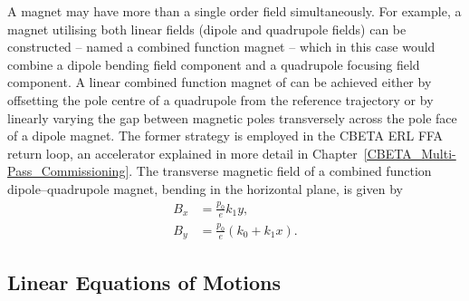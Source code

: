 \documentclass[../main.tex]{subfiles}
\begin{document}
A magnet may have more than a single order field simultaneously. For example, a magnet utilising both linear fields (dipole and quadrupole fields) can be constructed -- named a combined function magnet -- which in this case would combine a dipole bending field component and a quadrupole focusing field component. A linear combined function magnet of can be achieved either by offsetting the pole centre of a quadrupole from the reference trajectory or by linearly varying the gap between magnetic poles transversely across the pole face of a dipole magnet. The former strategy is employed in the CBETA ERL FFA return loop, an accelerator explained in more detail in Chapter~\ref{CBETA_Multi-Pass_Commissioning}. The transverse magnetic field of a combined function dipole--quadrupole magnet, bending in the horizontal plane, is given by 
\begin{align}
B_{x} &= \frac{p_{0}}{e}k_{1}y, \nonumber\\
B_{y} &= \frac{p_{0}}{e}\left(k_{0}+k_{1}x\right).
\label{eq:combined_function_field}    
\end{align}

\subsection{Linear Equations of Motions}
\end{document}
